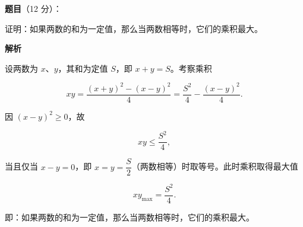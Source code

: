 \begin{answer}

\textbf{题目}（12 分）：

证明：如果两数的和为一定值，那么当两数相等时，它们的乘积最大。

\textbf{解析}

设两数为 $x$、$y$，其和为定值 $S$，即 $x+y=S$。考察乘积

\nopagebreak[4]
\[
xy=\frac{(x+y)^2-(x-y)^2}{4}
=\frac{S^2}{4}-\frac{(x-y)^2}{4}.
\]

因 $\left(x-y\right)^2\ge 0$，故

\nopagebreak[4]
\[
xy\le\frac{S^2}{4},
\]

当且仅当 $x-y=0$，即 $x=y=\dfrac S2$（两数相等）时取等号。此时乘积取得最大值

\nopagebreak[4]
\[
xy_{\max}=\frac{S^2}{4}.
\]

即：如果两数的和为一定值，那么当两数相等时，它们的乘积最大。


\end{answer}